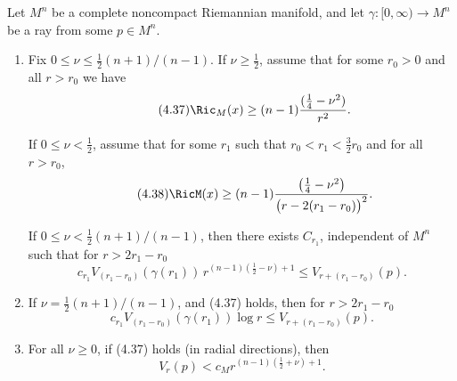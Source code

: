\begin{theorem}
\label{thm:asymptotic-ricci-volume-growth}

Let $M^n$ be a complete noncompact Riemannian manifold, and let
$\gamma:[0,\infty)\to M^n$ be a ray from some $p\in M^n$.
\begin{enumerate}
\item[(i)] Fix $0\le \nu\le \tfrac12(n+1)/(n-1)$. If $\nu\ge \tfrac12$, assume
that for some $r_0>0$ and all $r>r_0$ we have
\begin{equation}
\tag{4.37}
\Ric_M(x)\ge (n-1)\frac{(\frac14-\nu^2)}{r^2}.
\end{equation}

If $0 \leq \nu < \frac12$, assume that for some $r_1$ such that $r_0 < r_1 <
\frac32 r_0$ and for all $r > r_0$,
\begin{equation}\tag{4.38}
\RicM(x) \geq (n-1)\frac{\left(\frac14-\nu^2\right)}{\bigl(r-2(r_1-r_0)\bigr)^2}.
\end{equation}

If $0 \leq \nu < \frac12 (n+1)/(n-1)$, then there exists $C_{r_1}$,
independent of $M^n$ such that for $r > 2r_1-r_0$
\begin{equation}\tag{4.39}
c_{r_1}V_{(r_1-r_0)}(\gamma(r_1))\,r^{(n-1)(\frac12-\nu)+1} \leq V_{r+(r_1-r_0)}(p).
\end{equation}

\item[(ii)] If $\nu = \frac12 (n+1)/(n-1)$, and (4.37) holds, then for
$r > 2r_1-r_0$
\begin{equation}\tag{4.40}
c_{r_1}V_{(r_1-r_0)}(\gamma(r_1))\log r \leq V_{r+(r_1-r_0)}(p).
\end{equation}

\item[(iii)] For all $\nu \geq 0$, if (4.37) holds (in radial directions), then
\begin{equation}\tag{4.41}
V_r(p) < c_M r^{(n-1)(\frac12+\nu)+1}.
\end{equation}
\end{enumerate}
\end{theorem}

